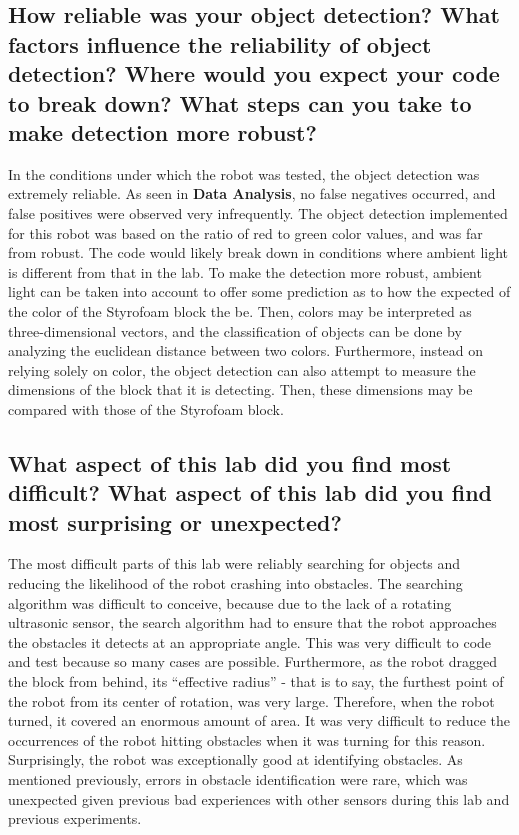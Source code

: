 \documentclass[10pt]{article}
\begin{document}
\subsection{How reliable was your object detection? What factors influence the reliability of object
	detection? Where would you expect your code to break down? What steps can you take to make
detection more robust?}
In the conditions under which the robot was tested, the object detection was extremely reliable. As
seen in \textbf{Data Analysis}, no false negatives occurred, and false positives were observed very
infrequently. The object detection implemented for this robot was based on the ratio of red to green
color values, and was far from robust. The code would likely break down in conditions where ambient
light is different from that in the lab. To make the detection more robust, ambient light can be
taken into account to offer some prediction as to how the expected of the color of the Styrofoam
block the be. Then, colors may be interpreted as three-dimensional vectors, and the classification
of objects can be done by analyzing the euclidean distance between two colors. Furthermore, instead
on relying solely on color, the object detection can also attempt to measure the dimensions of the
block that it is detecting. Then, these dimensions may be compared with those of the Styrofoam
block.
\subsection{What aspect of this lab did you find most difficult? What aspect of this lab did you
find most surprising or unexpected?}
The most difficult parts of this lab were reliably searching for objects and reducing the likelihood
of the robot crashing into obstacles. The searching algorithm was difficult to conceive, because due
to the lack of a rotating ultrasonic sensor, the search algorithm had to ensure that the robot
approaches the obstacles it detects at an appropriate angle. This was very difficult to code and
test because so many cases are possible. Furthermore, as the robot dragged the block from behind,
its ``effective radius'' - that is to say, the furthest point of the robot from its center of
rotation, was very large. Therefore, when the robot turned, it covered an enormous amount of area.
It was very difficult to reduce the occurrences of the robot hitting obstacles when it was turning
for this reason. Surprisingly, the robot was exceptionally good at identifying obstacles. As
mentioned previously, errors in obstacle identification were rare, which was unexpected given
previous bad experiences with other sensors during this lab and previous experiments.
\end{document}
